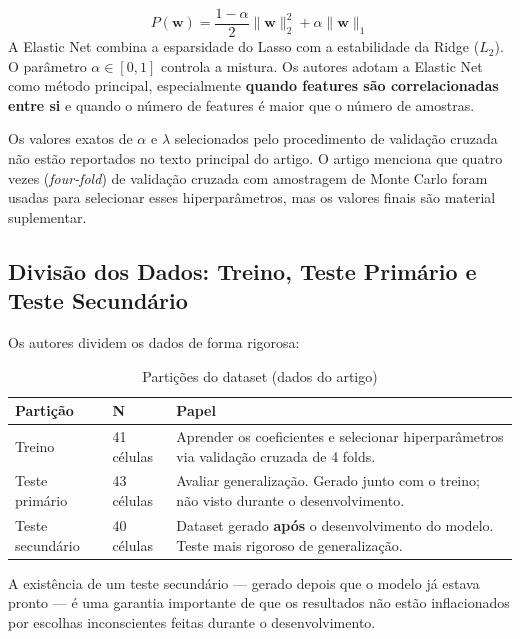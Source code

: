 \documentclass[12pt,a4paper]{article}
\begin{document}
\begin{conceito}
\[P(\mathbf{w}) = \frac{1-\alpha}{2}\|\mathbf{w}\|_2^2 + \alpha\|\mathbf{w}\|_1\]
A Elastic Net combina a esparsidade do Lasso com a estabilidade da Ridge
($L_2$). O par\^{a}metro $\alpha \in [0,1]$ controla a mistura.
Os autores adotam a Elastic Net como m\'{e}todo principal, especialmente
\textbf{quando features s\~ao correlacionadas entre si} e quando
o n\'{u}mero de features \'{e} maior que o n\'{u}mero de amostras.
\end{conceito}

\begin{atencao}
Os valores exatos de $\alpha$ e $\lambda$ selecionados pelo procedimento de
valida\c{c}\~ao cruzada n\~ao est\~ao reportados no texto principal do artigo.
O artigo menciona que quatro vezes (\textit{four-fold}) de valida\c{c}\~ao
cruzada com amostragem de Monte Carlo foram usadas para selecionar esses
hiperpar\^{a}metros, mas os valores finais s\~ao material suplementar.
\end{atencao}

\subsection{Divis\~ao dos Dados: Treino, Teste Prim\'{a}rio e Teste Secund\'{a}rio}

Os autores dividem os dados de forma rigorosa:

\begin{table}[H]
\centering
\caption{Parti\c{c}\~oes do dataset (dados do artigo)}
\begin{tabular}{@{}lp{3cm}p{7.5cm}@{}}
\toprule
\textbf{Parti\c{c}\~ao} & \textbf{N} & \textbf{Papel} \\
\midrule
Treino & 41 c\'{e}lulas &
  Aprender os coeficientes e selecionar hiperpar\^{a}metros
  via valida\c{c}\~ao cruzada de 4 folds. \\
Teste prim\'{a}rio & 43 c\'{e}lulas &
  Avaliar generaliza\c{c}\~ao. Gerado junto com o treino;
  n\~ao visto durante o desenvolvimento. \\
Teste secund\'{a}rio & 40 c\'{e}lulas &
  Dataset gerado \textbf{ap\'{o}s} o desenvolvimento do modelo.
  Teste mais rigoroso de generaliza\c{c}\~ao. \\
\bottomrule
\end{tabular}
\end{table}

A exist\^{e}ncia de um teste secund\'{a}rio --- gerado depois que o modelo j\'{a} estava
pronto --- \'{e} uma garantia importante de que os resultados n\~ao est\~ao
inflacionados por escolhas inconscientes feitas durante o desenvolvimento.
\end{document}
